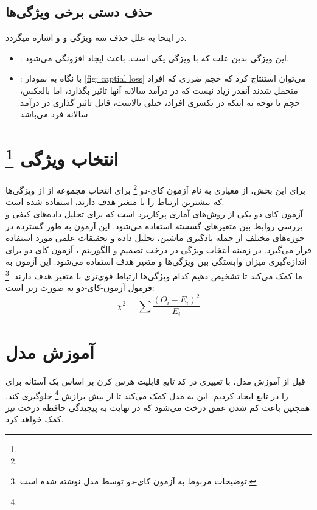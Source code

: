 \documentclass{article}
\begin{document}
\subsection{حذف دستی برخی ویژگی‌ها}
در اینحا به علل حذف سه ویژگی 
و
و
اشاره میگردد.
\begin{itemize}
	\item {}:
	 این ویژگی بدین علت که با ویژگی
	 یکی است. باعث ایجاد افزونگی می‌شود.
	\item {}:
	با نگاه به نمودار 
	\ref{fig: captial loss}
	می‌توان استنتاج کرد که حجم ضرری که افراد متحمل شدند آنقدر زیاد نیست که در درآمد سالانه آنها تاثیر بگذارد، اما بالعکس، حچم  با توجه به اینکه در یکسری افراد، خیلی بالاست، قابل تاثیر گذاری در درآمد سالانه فرد می‌باشد.
\end{itemize}
	
	\section{
		انتخاب ویژگی
		\footnote{}
		‌}
	برای این بخش، از معیاری به نام آزمون کای-دو
	\footnote{}
	برای انتخاب مجموعه از از ویژگی‌ها که بیشترین ارتباط را با متغیر هدف دارند، استفاده شده است.\\
	آزمون کای-دو یکی از روش‌های آماری پرکاربرد است که برای تحلیل داده‌های کیفی و بررسی روابط بین متغیرهای گسسته استفاده می‌شود. این آزمون به طور گسترده در حوزه‌های مختلف از جمله یادگیری ماشین، تحلیل داده و تحقیقات علمی مورد استفاده قرار می‌گیرد.
	در زمینه انتخاب ویژگی در درخت تصمیم و الگوریتم
	 ، آزمون کای-دو برای اندازه‌گیری میزان وابستگی بین ویژگی‌ها و متغیر هدف استفاده می‌شود. این آزمون به ما کمک می‌کند تا تشخیص دهیم کدام ویژگی‌ها ارتباط قوی‌تری با متغیر هدف دارند.
	 \footnote{
	 	توضیحات مربوط به آزمون کای-دو توسط مدل
	 	نوشته شده است.
	 }\\
	 فرمول آزمون-کای-دو به صورت زیر است:
	 \[
	 \chi^{2} = \sum \frac{(O_i - E_i)^2}{E_i}
	 \]
	\section{آموزش مدل}\label{sec: train}
	قبل از آموزش مدل، با تغییری در کد تابع 
	قابلیت هرس کرن بر اساس یک آستانه برای 
	را در تابع ایجاد کردیم.‌ این به مدل کمک می‌کند تا از بیش برازش
	\footnote{}
	جلوگیری کند. همچنین باعث کم شدن عمق درخت می‌شود که در نهایت به پیچیدگی حافظه درخت نیز کمک خواهد کرد.\\
\end{document}
